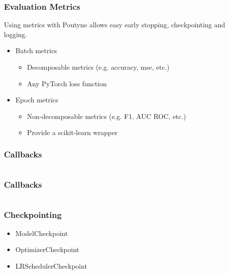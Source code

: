 \documentclass[french,english,usenames,dvipsnames]{beamer}
\begin{document}

    \begin{frame}[fragile]
        \frametitle{Evaluation Metrics}
        Using metrics with Poutyne allows easy early stopping, checkpointing and logging.
        \begin{itemize}
            \item<2-> Batch metrics
            \begin{itemize}
                \item Decomposable metrics (e.g. accuracy, mse, etc.)
                \item Any PyTorch loss function
            \end{itemize}
            \item<3-> Epoch metrics
            \begin{itemize}
                \item Non-decomposable metrics (e.g. F1, AUC ROC, etc.)
                \item Provide a scikit-learn wrapper
            \end{itemize}
        \end{itemize}
    \end{frame}



    \begin{frame}[fragile]
        \frametitle{Callbacks}
        \inputminted[fontsize=\scriptsize]{python3}{code/callback_interface.py}
    \end{frame}

    \begin{frame}[fragile]
        \frametitle{Callbacks}
        \inputminted[fontsize=\scriptsize]{python3}{code/example_callbacks.py}
    \end{frame}

    \begin{frame}
        \frametitle{Checkpointing}
        \begin{itemize}
            \item ModelCheckpoint
            \item OptimizerCheckpoint
            \item LRSchedulerCheckpoint
        \end{itemize}
    \end{frame}
\end{document}
